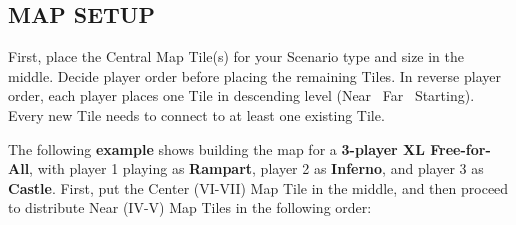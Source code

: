 \vspace{-3\baselineskip}

\subsection*{\MakeUppercase{Map Setup}}


First, place the Central Map Tile(s) for your Scenario type and size in the middle.
Decide player order before placing the remaining Tiles.
In reverse player order, each player places one Tile in descending level (Near \rightarrow\ Far \rightarrow\ Starting).  %
Every new Tile needs to connect to at least one existing Tile.

The following \textbf{example} shows building the map for a \textbf{3-player XL Free-for-All}, with player 1 playing as \textcolor{rampartbg}{\textbf{Rampart}}, player 2 as \textcolor{infernobg}{\textbf{Inferno}}, and player 3 as \textcolor{castlebg}{\textbf{Castle}}.
First, put the Center (VI-VII) Map Tile in the middle, and then proceed to distribute Near (IV-V) Map Tiles in the following order:

\bigskip

\newcommand{\playerimage}[2]{%
  \begin{minipage}[t]{0.28\textwidth} %
    \centering
    \texttt{[image: \#1]} %
    \captionof{figure}{\large\textbf{#2}}
  \end{minipage}%
}

\newcommand{\playerarrow}[4]{%
  \tikz[remember picture, overlay, baseline=(current bounding box.base)] {
    \coordinate (here) at (0,0);
    \draw[-Triangle, ultra thick, #4, opacity=0.8]
      ([shift={(#1,#2)}]here) -- ++({#3}:0.8cm);
  }%
}

